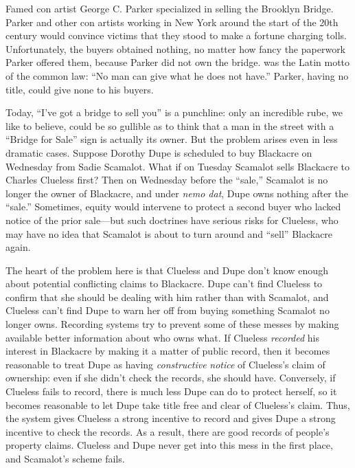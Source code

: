 Famed con artist George C. Parker specialized in selling the Brooklyn Bridge.
Parker and other con artists working in New York around the start of the 20th
century would convince victims that they stood to make a fortune charging
tolls. Unfortunately, the buyers obtained nothing, no matter how fancy the
paperwork Parker offered them, because Parker did not own the bridge.
 was the Latin motto of the common law:
``No man can give what he does not have.'' Parker, having no title, could give
none to his buyers.

Today, ``I've got a bridge to sell you'' is a punchline: only an incredible
rube, we like to believe, could be so gullible as to think that a man in the
street with a ``Bridge for Sale'' sign is actually its owner. But the problem
arises even in less dramatic cases. Suppose Dorothy Dupe is scheduled to buy
Blackacre on Wednesday from Sadie Scamalot. What if on Tuesday Scamalot sells
Blackacre to Charles Clueless first? Then on Wednesday before the ``sale,''
Scamalot is no longer the owner of Blackacre, and under \textit{nemo dat}, Dupe
owns nothing after the ``sale.'' Sometimes, equity would intervene to protect a
second buyer who lacked notice of the prior sale---but such doctrines have
serious risks for Clueless, who may have no idea that Scamalot is about to turn
around and ``sell'' Blackacre again.

The heart of the problem here is that Clueless and Dupe don't know enough about
potential conflicting claims to Blackacre. Dupe can't find Clueless to confirm
that she should be dealing with him rather than with Scamalot, and Clueless
can't find Dupe to warn her off from buying something Scamalot no longer owns.
Recording systems try to prevent some of these messes by making available
better information about who owns what. If Clueless \textit{recorded} his
interest in Blackacre by making it a matter of public record, then it becomes
reasonable to treat Dupe as having \textit{constructive} \textit{notice} of
Clueless's claim of ownership: even if she didn't check the records, she should
have. Conversely, if Clueless fails to record, there is much less Dupe can do
to protect herself, so it becomes reasonable to let Dupe take title free and
clear of Clueless's claim. Thus, the system gives Clueless a strong incentive
to record and gives Dupe a strong incentive to check the records. As a result,
there are good records of people's property claims. Clueless and Dupe never get
into this mess in the first place, and Scamalot's scheme fails.

